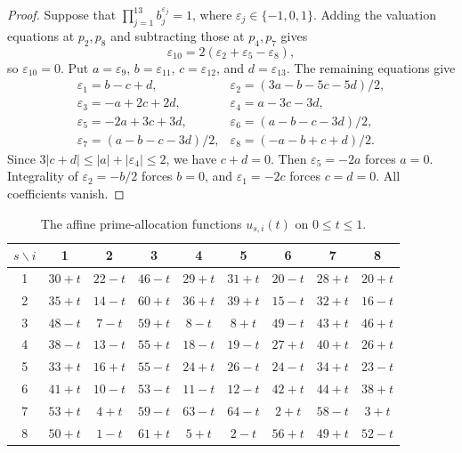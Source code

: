 \documentclass[11pt]{article}
\numberwithin{equation}{section}
\theoremstyle{remark}
\newcommand{\eps}{\varepsilon}
\begin{document}
\begin{proof}
Suppose that $\prod_{j=1}^{13}b_j^{\eps_j}=1$, where $\eps_j\in\{-1,0,1\}$. Adding the valuation equations at $p_2,p_8$ and subtracting those at $p_4,p_7$ gives
\[
\eps_{10}=2(\eps_2+\eps_5-\eps_8),
\]
so $\eps_{10}=0$. Put $a=\eps_9$, $b=\eps_{11}$, $c=\eps_{12}$, and $d=\eps_{13}$. The remaining equations give
\[
\begin{array}{ll}
\eps_1=b-c+d, & \eps_2=(3a-b-5c-5d)/2,\\
\eps_3=-a+2c+2d, & \eps_4=a-3c-3d,\\
\eps_5=-2a+3c+3d, & \eps_6=(a-b-c-3d)/2,\\
\eps_7=(a-b-c-3d)/2, & \eps_8=(-a-b+c+d)/2.
\end{array}
\]
Since $3|c+d|\le|a|+|\eps_4|\le2$, we have $c+d=0$. Then $\eps_5=-2a$ forces $a=0$. Integrality of $\eps_2=-b/2$ forces $b=0$, and $\eps_1=-2c$ forces $c=d=0$. All coefficients vanish.
\end{proof}

\begin{table}[ht]
\centering
\caption{The affine prime-allocation functions $u_{s,i}(t)$ on $0\le t\le1$.}\label{tab:alloc}
\begin{tabular}{@{}c|cccccccc@{}}
$s\backslash i$ & 1 & 2 & 3 & 4 & 5 & 6 & 7 & 8\\\hline
1 & $30+t$ & $22-t$ & $46-t$ & $29+t$ & $31+t$ & $20-t$ & $28+t$ & $20+t$\\
2 & $35+t$ & $14-t$ & $60+t$ & $36+t$ & $39+t$ & $15-t$ & $32+t$ & $16-t$\\
3 & $48-t$ & $7-t$ & $59+t$ & $8-t$ & $8+t$ & $49-t$ & $43+t$ & $46+t$\\
4 & $38-t$ & $13-t$ & $55+t$ & $18-t$ & $19-t$ & $27+t$ & $40+t$ & $26+t$\\
5 & $33+t$ & $16+t$ & $55-t$ & $24+t$ & $26-t$ & $24-t$ & $34+t$ & $23-t$\\
6 & $41+t$ & $10-t$ & $53-t$ & $11-t$ & $12-t$ & $42+t$ & $44+t$ & $38+t$\\
7 & $53+t$ & $4+t$ & $59-t$ & $63-t$ & $64-t$ & $2+t$ & $58-t$ & $3+t$\\
8 & $50+t$ & $1-t$ & $61+t$ & $5+t$ & $2-t$ & $56+t$ & $49+t$ & $52-t$
\end{tabular}
\end{table}
\end{document}

